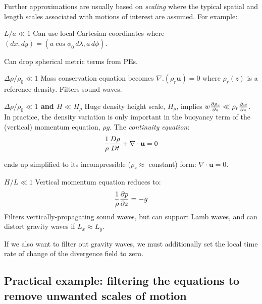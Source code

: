 Further approximations are usually based on {\em scaling} where
the typical spatial and length scales associated with motions of
interest are assumed. For example:

\begin{definition}

{\bf $L/a \ll 1$} Can use local Cartesian coordinates where $(dx,dy)=(a \cos\phi_0
\,d\lambda, a\,d\phi)$. 

Can drop spherical metric terms from PEs.
\end{definition}


\begin{definition}
{\bf $\Delta \rho /\rho_0 \ll 1$} Mass conservation equation becomes $\nabla.(\rho_r {\mathbf u})=0$
where $\rho_r(z)$ is a reference density.
Filters sound waves.
\end{definition}

\begin{definition}
{\bf $\Delta \rho /\rho_0 \ll 1$ and $H\ll H_{\rho}$} Huge density height scale, $H_{\rho}$, implies $w \frac{\partial \rho_r}{\partial z}\ll
\rho_r \frac{\partial w}{\partial z}$. In practice, the density variation is only important in the buoyancy term of the (vertical) momentum equation, $\rho g$. The \emph{continuity equation}:
\begin{equation}
	\frac{1}{\rho} \frac{D \rho}{D t} + \nabla \cdot \mathbf{u} = 0
	\label{continuity-equation}
\end{equation}

ends up simplified to its incompressible ($\rho_r \approx$ constant) form: $\nabla \cdot \mathbf{u} = 0$. 

\end{definition}

\begin{definition}
{\bf $H/L \ll 1$} Vertical momentum equation reduces to:
\begin{equation}
	\frac{1}{\rho}\frac{\partial p}{\partial z}=-g
	\label{hydrostatic}
\end{equation}
Filters vertically-propagating sound waves, but can support Lamb waves, and can distort gravity waves if $L_x \approx L_y$.

If we also want to filter out gravity waves, we must additionally set the local time rate of change of the divergence field to zero.
\end{definition}


\subsection{Practical example: filtering the equations to remove unwanted scales of motion} 

